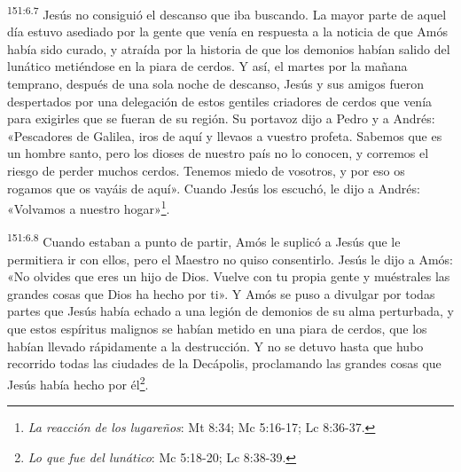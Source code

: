 \par 
\textsuperscript{151:6.7} Jesús no consiguió el descanso que iba buscando. La mayor parte de aquel día estuvo asediado por la gente que venía en respuesta a la noticia de que Amós había sido curado, y atraída por la historia de que los demonios habían salido del lunático metiéndose en la piara de cerdos. Y así, el martes por la mañana temprano, después de una sola noche de descanso, Jesús y sus amigos fueron despertados por una delegación de estos gentiles criadores de cerdos que venía para exigirles que se fueran de su región. Su portavoz dijo a Pedro y a Andrés: «Pescadores de Galilea, iros de aquí y llevaos a vuestro profeta. Sabemos que es un hombre santo, pero los dioses de nuestro país no lo conocen, y corremos el riesgo de perder muchos cerdos. Tenemos miedo de vosotros, y por eso os rogamos que os vayáis de aquí». Cuando Jesús los escuchó, le dijo a Andrés: «Volvamos a nuestro hogar»\footnote{\textit{La reacción de los lugareños}: Mt 8:34; Mc 5:16-17; Lc 8:36-37.}.

\par 
\textsuperscript{151:6.8} Cuando estaban a punto de partir, Amós le suplicó a Jesús que le permitiera ir con ellos, pero el Maestro no quiso consentirlo. Jesús le dijo a Amós: «No olvides que eres un hijo de Dios. Vuelve con tu propia gente y muéstrales las grandes cosas que Dios ha hecho por ti». Y Amós se puso a divulgar por todas partes que Jesús había echado a una legión de demonios de su alma perturbada, y que estos espíritus malignos se habían metido en una piara de cerdos, que los habían llevado rápidamente a la destrucción. Y no se detuvo hasta que hubo recorrido todas las ciudades de la Decápolis, proclamando las grandes cosas que Jesús había hecho por él\footnote{\textit{Lo que fue del lunático}: Mc 5:18-20; Lc 8:38-39.}.